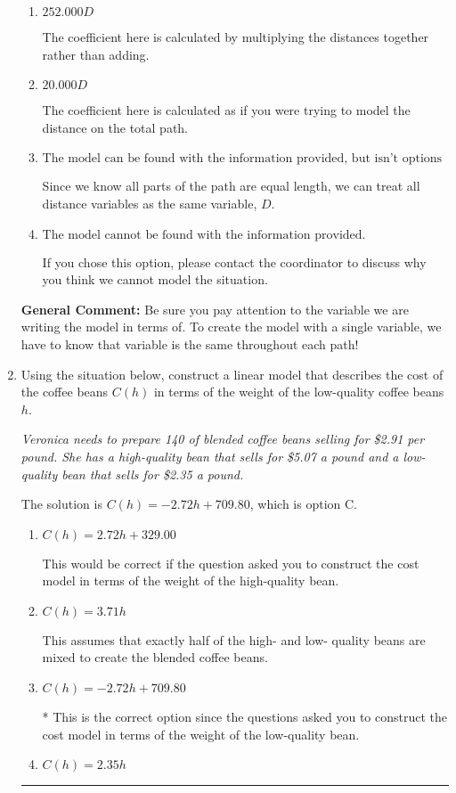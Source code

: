 \documentclass{extbook}[14pt]
\newcommand{\litem}[1]{\item #1

\rule{\textwidth}{0.4pt}}
\begin{document}
\begin{enumerate}
{\begin{enumerate}[label=\Alph*.]
* This is the correct option.
\item \( 252.000 D \)

The coefficient here is calculated by multiplying the distances together rather than adding.
\item \( 20.000 D \)

The coefficient here is calculated as if you were trying to model the distance on the total path.
\item \( \text{The model can be found with the information provided, but isn't options 1-3.} \)

Since we know all parts of the path are equal length, we can treat all distance variables as the same variable, $D$.
\item \( \text{The model cannot be found with the information provided.} \)

If you chose this option, please contact the coordinator to discuss why you think we cannot model the situation.
\end{enumerate}

\textbf{General Comment:} Be sure you pay attention to the variable we are writing the model in terms of. To create the model with a single variable, we have to know that variable is the same throughout each path!
}
\litem{
Using the situation below, construct a linear model that describes the cost of the coffee beans $C(h)$ in terms of the weight of the low-quality coffee beans $h$.

\begin{center}
    \textit{ Veronica needs to prepare 140 of blended coffee beans selling for \$2.91 per pound. She has a high-quality bean that sells for \$5.07 a pound and a low-quality bean that sells for \$2.35 a pound. }
\end{center}
The solution is \( C(h) = -2.72 h + 709.80 \), which is option C.\begin{enumerate}[label=\Alph*.]
\item \( C(h) = 2.72 h + 329.00 \)

This would be correct if the question asked you to construct the cost model in terms of the weight of the high-quality bean.
\item \( C(h) = 3.71 h \)

This assumes that exactly half of the high- and low- quality beans are mixed to create the blended coffee beans.
\item \( C(h) = -2.72 h + 709.80 \)

* This is the correct option since the questions asked you to construct the cost model in terms of the weight of the low-quality bean.
\item \( C(h) = 2.35 h \)


\end{enumerate}}
\end{enumerate}
\end{document}

